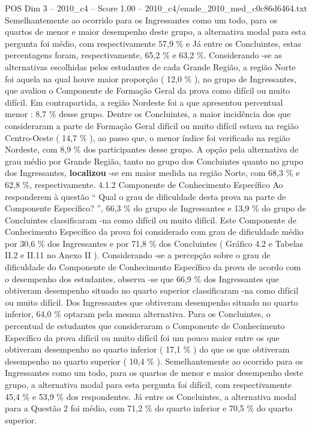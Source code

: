 \begin{textsample}{POS Dim 3 – 2010\_c4 – Score 1.00 – 2010\_c4/enade\_2010\_med\_c0c86d6464.txt}
Semelhantemente ao ocorrido para os Ingressantes como um todo, para os quartos de menor e maior desempenho deste grupo, a alternativa modal para esta pergunta foi médio, com respectivamente 57,9 \% e Já entre os Concluintes, estas percentagens foram, respectivamente, 65,2 \% e 63,2 \%.
Considerando -se as alternativas escolhidas pelos estudantes de cada Grande Região, a região Norte foi aquela na qual houve maior proporção ( 12,0 \% ), no grupo de Ingressantes, que avaliou o Componente de Formação Geral da prova como difícil ou muito difícil.
Em contrapartida, a região Nordeste foi a que apresentou percentual menor : 8,7 \% desse grupo.
Dentre os Concluintes, a maior incidência dos que consideraram a parte de Formação Geral difícil ou muito difícil estava na região Centro-Oeste ( 14,7 \% ), ao passo que, o menor índice foi verificado na região Nordeste, com 8,9 \% dos participantes desse grupo.
A opção pela alternativa de grau médio por Grande Região, tanto no grupo dos Concluintes quanto no grupo dos Ingressantes, \textbf{localizou} -se em maior medida na região Norte, com 68,3 \% e 62,8 \%, respectivamente. 4.1.2 Componente de Conhecimento Específico Ao responderem à questão “ Qual o grau de dificuldade desta prova na parte de Componente Específico? ”, 66,3 \% do grupo de Ingressantes e 13,9 \% do grupo de Concluintes classificaram -na como difícil ou muito difícil.
Este Componente de Conhecimento Específico da prova foi considerado com grau de dificuldade médio por 30,6 \% dos Ingressantes e por 71,8 \% dos Concluintes ( Gráfico 4.2 e Tabelas II.2 e II.11 no Anexo II ).
Considerando -se a percepção sobre o grau de dificuldade do Componente de Conhecimento Específico da prova de acordo com o desempenho dos estudantes, observa -se que 66,9 \% dos Ingressantes que obtiveram desempenho situado no quarto superior classificaram -na como difícil ou muito difícil.
Dos Ingressantes que obtiveram desempenho situado no quarto inferior, 64,0 \% optaram pela mesma alternativa.
Para os Concluintes, o percentual de estudantes que consideraram o Componente de Conhecimento Específico da prova difícil ou muito difícil foi um pouco maior entre os que obtiveram desempenho no quarto inferior ( 17,1 \% ) do que os que obtiveram desempenho no quarto superior ( 10,4 \% ).
Semelhantemente ao ocorrido para os Ingressantes como um todo, para os quartos de menor e maior desempenho deste grupo, a alternativa modal para esta pergunta foi difícil, com respectivamente 45,4 \% e 53,9 \% dos respondentes.
Já entre os Concluintes, a alternativa modal para a Questão 2 foi médio, com 71,2 \% do quarto inferior e 70,5 \% do quarto superior.

\end{textsample}
